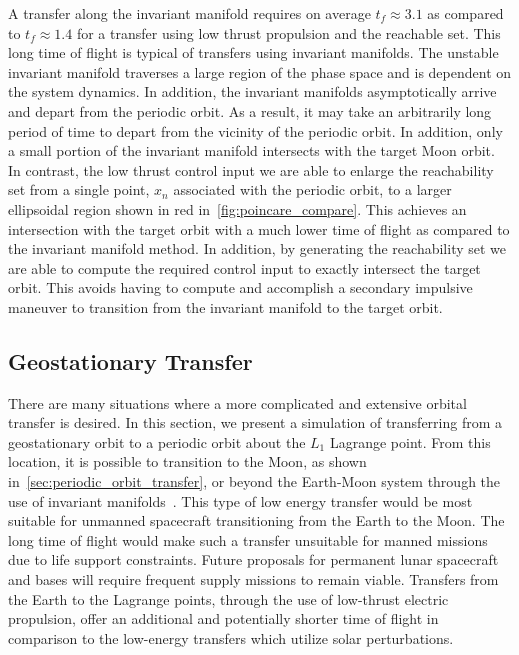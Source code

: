 \documentclass[smallcondensed]{svjour3}
\begin{document}
A transfer along the invariant manifold requires on average \( t_f \approx 3.1 \) as compared to \( t_f \approx 1.4 \) for a transfer using low thrust propulsion and the reachable set.
This long time of flight is typical of transfers using invariant manifolds.
The unstable invariant manifold traverses a large region of the phase space and is dependent on the system dynamics. 
In addition, the invariant manifolds asymptotically arrive and depart from the periodic orbit. 
As a result, it may take an arbitrarily long period of time to depart from the vicinity of the periodic orbit.
In addition, only a small portion of the invariant manifold intersects with the target Moon orbit.
In contrast, the low thrust control input we are able to enlarge the reachability set from a single point, \( x_n\) associated with the periodic orbit, to a larger ellipsoidal region shown in red in~\cref{fig:poincare_compare}.
This achieves an intersection with the target orbit with a much lower time of flight as compared to the invariant manifold method.
In addition, by generating the reachability set we are able to compute the required control input to exactly intersect the target orbit.
This avoids having to compute and accomplish a secondary impulsive maneuver to transition from the invariant manifold to the target orbit.

\subsection{Geostationary Transfer}\label{sec:geo_transfer}

There are many situations where a more complicated and extensive orbital transfer is desired. 
In this section, we present a simulation of transferring from a geostationary orbit to a periodic orbit about the \( L_1 \) Lagrange point.
From this location, it is possible to transition to the Moon, as shown in~\cref{sec:periodic_orbit_transfer}, or beyond the Earth-Moon system through the use of invariant manifolds~\cite{koon2011}.
This type of low energy transfer would be most suitable for unmanned spacecraft transitioning from the Earth to the Moon.
The long time of flight would make such a transfer unsuitable for manned missions due to life support constraints.
Future proposals for permanent lunar spacecraft and bases will require frequent supply missions to remain viable. 
Transfers from the Earth to the Lagrange points, through the use of low-thrust electric propulsion, offer an additional and potentially shorter time of flight in comparison to the low-energy transfers which utilize solar perturbations.
\end{document}
